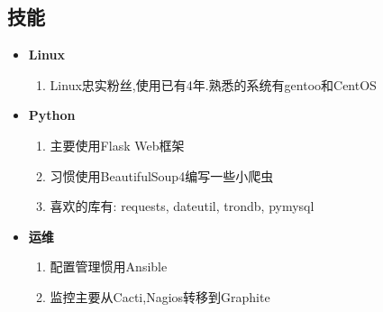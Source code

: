 \documentclass[11pt,letterpaper]{article}
\newcommand{\resitem}[1]{\item #1 \vspace{-2pt}}
\begin{document}
\begin{CJK}{UTF8}{gbsn}
\section{技能}
	\begin{itemize}
		\item
			\textbf{Linux}
			{ \footnotesize
			\begin{enumerate}
				\resitem{Linux忠实粉丝,使用已有4年.熟悉的系统有gentoo和CentOS}
			\end{enumerate}
			}
		\item
			\textbf{Python}
			{ \footnotesize
			\begin{enumerate}
				\resitem{主要使用Flask Web框架}
				\resitem{习惯使用BeautifulSoup4编写一些小爬虫}
				\resitem{喜欢的库有: requests, dateutil, trondb, pymysql}
			\end{enumerate}
			}
		\item
			\textbf{运维}
			{ \footnotesize
			\begin{enumerate}
				\resitem{配置管理惯用Ansible}
				\resitem{监控主要从Cacti,Nagios转移到Graphite}
			\end{enumerate}
			}
	\end{itemize}

\end{CJK} 
\end{document}
